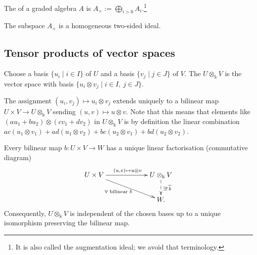 \begin{definition}\label{def:positive-ideal}
The  of a graded algebra $A$ is $A_+:=\bigoplus_{i>0}A_i$.\footnote{It is also called the augmentation ideal; we avoid that terminology.}
\end{definition}

The subspace $A_+$ is a homogeneous two-sided ideal.

\subsection{Tensor products of vector spaces}

\begin{definition}\label{def:vector-tensor}
Choose a basis $\{u_i\mid i\in I\}$ of $U$ and a basis $\{v_j\mid j\in J\}$ of $V$.
The  $U\otimes_\Bbbk V$ is the vector space with basis $\{u_i\otimes v_j\mid i\in I,\ j\in J\}$.
\end{definition}

The assignment $(u_i,v_j)\mapsto u_i\otimes v_j$ extends uniquely to a bilinear map $U\times V\to U\otimes_\Bbbk V$ sending $(u,v)\mapsto u\otimes v$.  Note that this means that elements like $(au_1+bu_2)\otimes (cv_1+dv_2)$ in $U\otimes_\Bbbk V$ is by definition the linear combination $ac(u_1\otimes v_1) + ad(u_1\otimes v_2) + bc(u_2\otimes v_1) + bd(u_2\otimes v_2)$.


\begin{proposition}\label{prop:vector-tensor-universal}
Every bilinear map $b:U\times V\to W$ has a unique linear factorisation (commutative diagram)
\[
\xymatrix@C=60pt@R=22pt{
U\times V \ar[r]^{(u,v)\mapsto u\otimes v} \ar[dr]_{\forall \text{ bilinear } b\phantom{...}}
& U\otimes_\Bbbk V \ar@{-->}[d]^{\exists!\,\widetilde b}\\
& W.
}
\]
Consequently, $U\otimes_\Bbbk V$ is independent of the chosen bases up to a unique isomorphism preserving the bilinear map.
\end{proposition}


